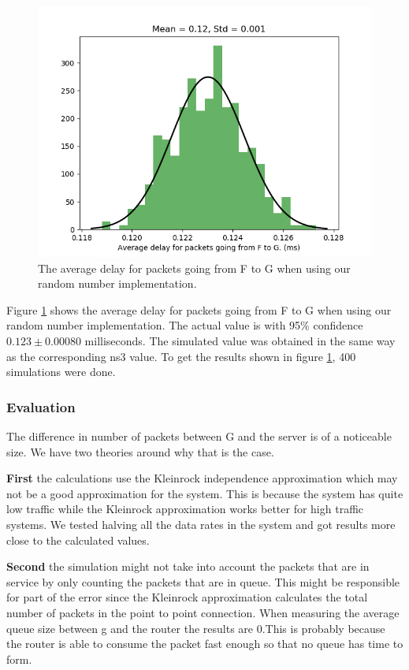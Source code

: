 \documentclass{article}
\begin{document}
\begin{figure}[!htbp]
    \centering
    \includegraphics[width=0.85\linewidth]{our_fg_delay.png}
    \caption{The average delay for packets going from F to G when using our random number implementation.}
    \label{fig:FGOur}
\end{figure}

Figure \ref{fig:FGOur} shows the average delay for packets going from F to G when using our random number implementation.
The actual value is with 95\% confidence $0.123 \pm 0.00080$ milliseconds.
The simulated value was obtained in the same way as the corresponding ns3 value.
To get the results shown in figure \ref{fig:FGOur}, 400 simulations were done.

\subsubsection{Evaluation}
The difference in number of packets between G and the server is of a noticeable size. We have 
two theories around why that is the case.

\textbf{First} the calculations use the Kleinrock independence approximation which may not be 
a good approximation for the system. This is because the system has quite low traffic while the 
Kleinrock approximation works better for high traffic systems. We tested halving all the data 
rates in the system and got results more close to the calculated values.

\textbf{Second} the simulation might not take into account the packets that are in service 
by only counting the packets that are in queue. This might be responsible for part of the 
error since the Kleinrock approximation calculates the total number of packets in the point 
to point connection. When measuring the average queue size between g and the router the 
results are 0.This is probably because the router is able to consume the packet fast enough 
so that no queue has time to form.
\end{document}
